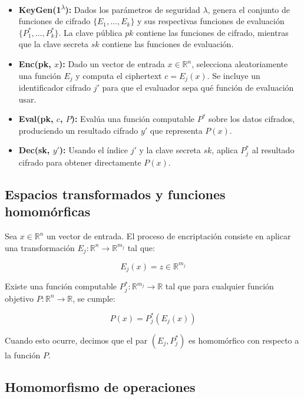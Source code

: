 \documentclass[11pt]{article}
\theoremstyle{plain}
\begin{document}
\begin{itemize}
    \item \textbf{KeyGen(1\textsuperscript{$\lambda$}):} Dados los parámetros de seguridad $\lambda$, genera el conjunto de funciones de cifrado \( \{E_1, \dots, E_k\} \) y sus respectivas funciones de evaluación \( \{P^*_1, \dots, P^*_k\} \). La clave pública \( pk \) contiene las funciones de cifrado, mientras que la clave secreta \( sk \) contiene las funciones de evaluación.
    
    \item \textbf{Enc(pk, $x$):} Dado un vector de entrada $x \in \mathbb{R}^n$, selecciona aleatoriamente una función $E_j$ y computa el ciphertext $c = E_j(x)$. Se incluye un identificador cifrado $j'$ para que el evaluador sepa qué función de evaluación usar.
    
    \item \textbf{Eval(pk, $c$, $P$):} Evalúa una función computable $P^*$ sobre los datos cifrados, produciendo un resultado cifrado $y'$ que representa $P(x)$.
    
    \item \textbf{Dec(sk, $y'$):} Usando el índice $j'$ y la clave secreta $sk$, aplica $P^*_j$ al resultado cifrado para obtener directamente $P(x)$.
\end{itemize}

\subsection{Espacios transformados y funciones homomórficas}

Sea $x \in \mathbb{R}^n$ un vector de entrada. El proceso de encriptación consiste en aplicar una transformación $E_j: \mathbb{R}^n \rightarrow \mathbb{R}^{m_j}$ tal que:

\[
E_j(x) = z \in \mathbb{R}^{m_j}
\]

Existe una función computable \( P^*_j: \mathbb{R}^{m_j} \rightarrow \mathbb{R} \) tal que para cualquier función objetivo \( P: \mathbb{R}^n \rightarrow \mathbb{R} \), se cumple:

\[
P(x) = P^*_j(E_j(x))
\]

Cuando esto ocurre, decimos que el par $(E_j, P^*_j)$ es homomórfico con respecto a la función $P$.

\subsection{Homomorfismo de operaciones}
\end{document}
